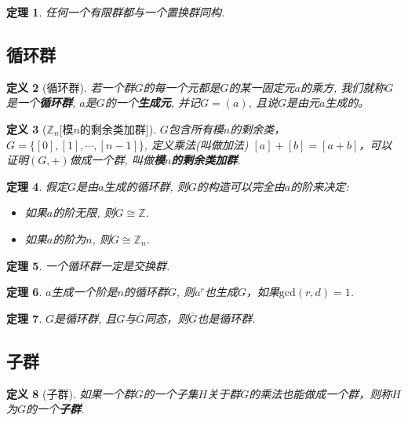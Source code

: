 \documentclass[UTF8]{ctexart}
\newtheorem{Definition}{定义}%
\newtheorem{Theorem}[Definition]{定理}
\begin{document}
\begin{Theorem}
任何一个有限群都与一个置换群同构.
\end{Theorem}

\subsection{循环群}

\begin{Definition}[循环群]
若一个群$G$的每一个元都是$G$的某一固定元$a$的乘方, 我们就称$G$是一个\textbf{循环群}, $a$是$G$的一个\textbf{生成元}, 并记$G = (a)$, 且说$G$是由元$a$生成的。
\end{Definition}

\begin{Definition}[$\mathbb{Z}_n$\mbox{[模$n$的剩余类加群]}]
$G$包含所有模$n$的剩余类，$G = \{ [0], [1], \cdots, [n-1] \}$, 定义乘法(叫做加法) $[a] + [b] = [a +b]$，可以证明$(G, +)$做成一个群, 叫做\textbf{模$n$的剩余类加群}.
\end{Definition}

\begin{Theorem}
假定$G$是由$a$生成的循环群, 则$G$的构造可以完全由$a$的阶来决定:
\begin{itemize}
\item 如果$a$的阶无限, 则$G \cong \mathbb{Z}$.
\item 如果$a$的阶为$n$, 则$G \cong \mathbb{Z}_n$.
\end{itemize}
\end{Theorem}

\begin{Theorem}
一个循环群一定是交换群.
\end{Theorem}



\begin{Theorem}
$a$生成一个阶是$n$的循环群$G$, 则$a^r$也生成$G$，如果$\text{gcd}(r, d) = 1$.
\end{Theorem}

\begin{Theorem}
$G$是循环群, 且$G$与$\bar{G}$同态，则$\bar{G}$也是循环群.
\end{Theorem}


\subsection{子群}

\begin{Definition}[子群]
如果一个群$G$的一个子集$H$关于群$G$的乘法也能做成一个群，则称$H$为$G$的一个\textbf{子群}.
\end{Definition}
\end{document}
